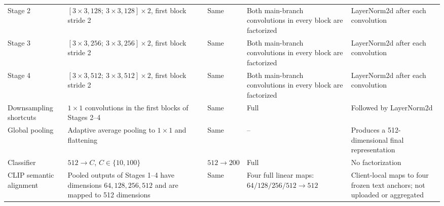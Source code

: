 \begin{table}[t]
\begin{tabularx}{\textwidth}{@{}lXXp{2.7cm}X@{}}
Stage 2 & $[3\times3,128;\ 3\times3,128]\times2$, first block stride 2 & Same & Both main-branch convolutions in every block are factorized & LayerNorm2d after each convolution \\
Stage 3 & $[3\times3,256;\ 3\times3,256]\times2$, first block stride 2 & Same & Both main-branch convolutions in every block are factorized & LayerNorm2d after each convolution \\
Stage 4 & $[3\times3,512;\ 3\times3,512]\times2$, first block stride 2 & Same & Both main-branch convolutions in every block are factorized & LayerNorm2d after each convolution \\
Downsampling shortcuts & $1\times1$ convolutions in the first blocks of Stages 2--4 & Same & Full & Followed by LayerNorm2d \\
Global pooling & Adaptive average pooling to $1\times1$ and flattening & Same & -- & Produces a 512-dimensional final representation \\
Classifier & $512\rightarrow C$, $C\in\{10,100\}$ & $512\rightarrow200$ & Full & No factorization \\
CLIP semantic alignment & Pooled outputs of Stages 1--4 have dimensions $64,128,256,512$ and are mapped to 512 dimensions & Same & Four full linear maps: $64/128/256/512\rightarrow512$ & Client-local maps to four frozen text anchors; not uploaded or aggregated \\
\bottomrule
\end{tabularx}
\end{table}

